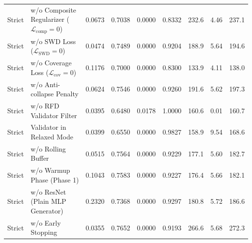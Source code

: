 \begin{tabular}{lllllllll}
Strict & w/o Composite Regularizer ($\mathcal{L}_{\mathrm{comp}}=0$) & 0.0673 & 0.7038 & 0.0000 & 0.8332 & 232.6 & 4.46 & 237.1 \\
Strict & w/o SWD Loss ($\mathcal{L}_{\mathrm{SWD}}=0$) & 0.0474 & 0.7489 & 0.0000 & 0.9204 & 188.9 & 5.64 & 194.6 \\
Strict & w/o Coverage Loss ($\mathcal{L}_{\mathrm{cov}}=0$) & 0.1176 & 0.7000 & 0.0000 & 0.8300 & 133.9 & 4.11 & 138.0 \\
Strict & w/o Anti-collapse Penalty & 0.0624 & 0.7546 & 0.0000 & 0.9260 & 191.6 & 5.62 & 197.3 \\
Strict & w/o RFD Validator Filter & 0.0395 & 0.6480 & 0.0178 & 1.0000 & 160.6 & 0.01 & 160.7 \\
Strict & Validator in Relaxed Mode & 0.0399 & 0.6550 & 0.0000 & 0.9827 & 158.9 & 9.54 & 168.6 \\
Strict & w/o Rolling Buffer & 0.0515 & 0.7564 & 0.0000 & 0.9229 & 177.1 & 5.60 & 182.7 \\
Strict & w/o Warmup Phase (Phase 1) & 0.1043 & 0.7583 & 0.0000 & 0.9227 & 176.4 & 5.66 & 182.1 \\
Strict & w/o ResNet (Plain MLP Generator) & 0.2320 & 0.7368 & 0.0000 & 0.9297 & 180.8 & 5.72 & 186.6 \\
Strict & w/o Early Stopping & 0.0355 & 0.7652 & 0.0000 & 0.9193 & 266.6 & 5.68 & 272.3 \\
\bottomrule
\end{tabular}
